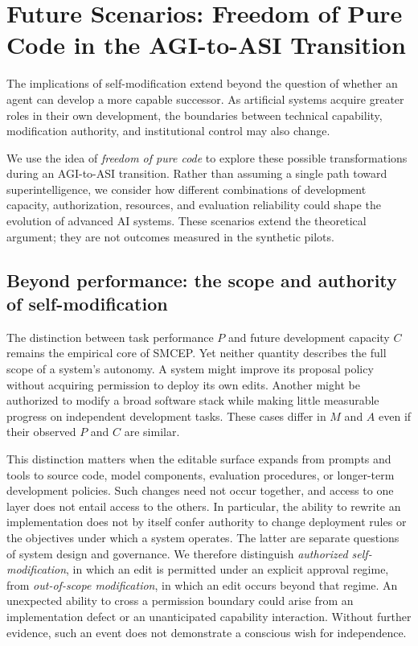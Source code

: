 \documentclass[11pt,a4paper]{article}
\begin{document}
\section{Future Scenarios: Freedom of Pure Code in the AGI-to-ASI Transition}\label{sec:future}
The implications of self-modification extend beyond the question of whether an agent can develop a more
capable successor. As artificial systems acquire greater roles in their own development, the boundaries
between technical capability, modification authority, and institutional control may also change.

We use the idea of \emph{freedom of pure code} to explore these possible transformations during an
AGI-to-ASI transition. Rather than assuming a single path toward superintelligence, we consider how
different combinations of development capacity, authorization, resources, and evaluation reliability
could shape the evolution of advanced AI systems. These scenarios extend the theoretical argument;
they are not outcomes measured in the synthetic pilots.

\subsection{Beyond performance: the scope and authority of self-modification}
The distinction between task performance $P$ and future development capacity $C$ remains the empirical core of SMCEP. Yet neither quantity describes the full scope of a system's autonomy. A system might improve its proposal policy without acquiring permission to deploy its own edits. Another might be authorized to modify a broad software stack while making little measurable progress on independent development tasks. These cases differ in $M$ and $A$ even if their observed $P$ and $C$ are similar.

This distinction matters when the editable surface expands from prompts and tools to source code, model components, evaluation procedures, or longer-term development policies. Such changes need not occur together, and access to one layer does not entail access to the others. In particular, the ability to rewrite an implementation does not by itself confer authority to change deployment rules or the objectives under which a system operates. The latter are separate questions of system design and governance. We therefore distinguish \emph{authorized self-modification}, in which an edit is permitted under an explicit approval regime, from \emph{out-of-scope modification}, in which an edit occurs beyond that regime. An unexpected ability to cross a permission boundary could arise from an implementation defect or an unanticipated capability interaction. Without further evidence, such an event does not demonstrate a conscious wish for independence.
\end{document}
